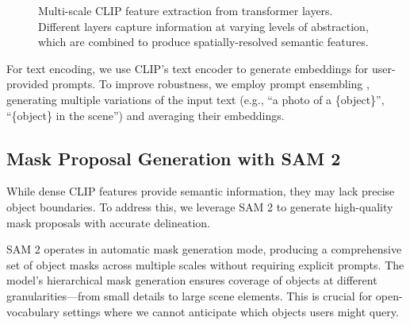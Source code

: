 \begin{figure}[h]
\centering
{}
\caption{Multi-scale CLIP feature extraction from transformer layers. Different layers capture information at varying levels of abstraction, which are combined to produce spatially-resolved semantic features.}
\label{fig:multiscale_features}
\end{figure}

For text encoding, we use CLIP's text encoder to generate embeddings for user-provided prompts. To improve robustness, we employ prompt ensembling \cite{zhou2022learning}, generating multiple variations of the input text (e.g., ``a photo of a \{object\}'', ``\{object\} in the scene'') and averaging their embeddings.

\subsection{Mask Proposal Generation with SAM 2}

While dense CLIP features provide semantic information, they may lack precise object boundaries. To address this, we leverage SAM 2 \cite{ravi2024sam2} to generate high-quality mask proposals with accurate delineation.

SAM 2 operates in automatic mask generation mode, producing a comprehensive set of object masks across multiple scales without requiring explicit prompts. The model's hierarchical mask generation ensures coverage of objects at different granularities—from small details to large scene elements. This is crucial for open-vocabulary settings where we cannot anticipate which objects users might query.

